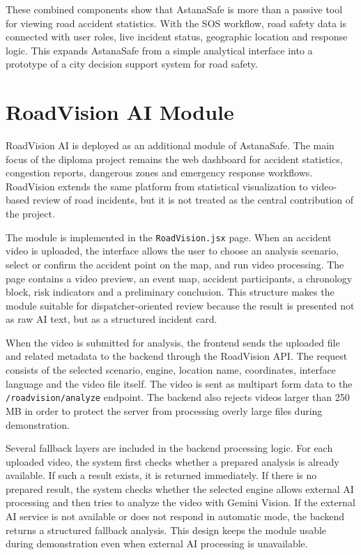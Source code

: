﻿\documentclass[12pt,a4paper]{report}
\begin{document}
These combined components show that AstanaSafe is more than a passive tool for viewing road accident statistics. With the SOS workflow, road safety data is connected with user roles, live incident status, geographic location and response logic. This expands AstanaSafe from a simple analytical interface into a prototype of a city decision support system for road safety.

\section{RoadVision AI Module}

RoadVision AI is deployed as an additional module of AstanaSafe. The main focus of the diploma project remains the web dashboard for accident statistics, congestion reports, dangerous zones and emergency response workflows. RoadVision extends the same platform from statistical visualization to video-based review of road incidents, but it is not treated as the central contribution of the project.

The module is implemented in the \texttt{RoadVision.jsx} page. When an accident video is uploaded, the interface allows the user to choose an analysis scenario, select or confirm the accident point on the map, and run video processing. The page contains a video preview, an event map, accident participants, a chronology block, risk indicators and a preliminary conclusion. This structure makes the module suitable for dispatcher-oriented review because the result is presented not as raw AI text, but as a structured incident card.

When the video is submitted for analysis, the frontend sends the uploaded file and related metadata to the backend through the RoadVision API. The request consists of the selected scenario, engine, location name, coordinates, interface language and the video file itself. The video is sent as multipart form data to the \texttt{/roadvision/analyze} endpoint. The backend also rejects videos larger than 250 MB in order to protect the server from processing overly large files during demonstration.

Several fallback layers are included in the backend processing logic. For each uploaded video, the system first checks whether a prepared analysis is already available. If such a result exists, it is returned immediately. If there is no prepared result, the system checks whether the selected engine allows external AI processing and then tries to analyze the video with Gemini Vision. If the external AI service is not available or does not respond in automatic mode, the backend returns a structured fallback analysis. This design keeps the module usable during demonstration even when external AI processing is unavailable.
\end{document}

